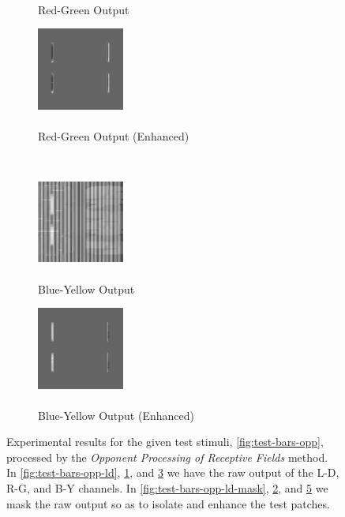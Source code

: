 \documentclass[journal,onecolumn]{IEEEtran}
\begin{document}
{\begin{figure}[H]
\begin{subfigure}[b]{0.5\textwidth}
            \caption{\\ Red-Green Output}
            \label{fig:test-bars-opp-rg}
    \end{subfigure}%
    \begin{subfigure}[b]{0.5\textwidth}
            \centering
            \includegraphics[width=108px, frame]{test-bars-opp-rg-mask}
            \caption{\\ Red-Green Output (Enhanced)}
            \label{fig:test-bars-opp-rg-mask}
    \end{subfigure}\\
    \begin{subfigure}[b]{0.5\textwidth}
            \centering
            \includegraphics[width=108px, frame]{test-bars-opp-by}
            \caption{\\ Blue-Yellow Output}
            \label{fig:test-bars-opp-by}
    \end{subfigure}%
    \begin{subfigure}[b]{0.5\textwidth}
            \centering
            \includegraphics[width=108px, frame]{test-bars-opp-by-mask}
            \caption{\\ Blue-Yellow Output (Enhanced)}
            \label{fig:test-bars-opp-by-mask}
    \end{subfigure}
    \caption{Experimental results for the given test stimuli, \ref{fig:test-bars-opp}, processed by the \textit{Opponent Processing of Receptive Fields} method. In \ref{fig:test-bars-opp-ld}, \ref{fig:test-bars-opp-rg}, and \ref{fig:test-bars-opp-by} we have the raw output of the L-D, R-G, and B-Y channels. In \ref{fig:test-bars-opp-ld-mask}, \ref{fig:test-bars-opp-rg-mask}, and \ref{fig:test-bars-opp-by-mask} we mask the raw output so as to isolate and enhance the test patches.}
\end{figure}
\clearpage
}
\end{document}
